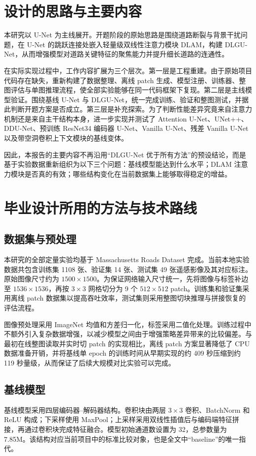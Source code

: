 \documentclass[12pt,a4paper]{ctexart}
\begin{document}
\section{设计的思路与主要内容}
本研究以 U-Net 为主线展开。开题阶段的原始思路是围绕道路断裂与背景干扰问题，在 U-Net 的跳跃连接处嵌入轻量级双线性注意力模块 DLAM，构建 DLGU-Net，从而增强模型对道路关键特征的聚焦能力并提升细长道路的连通性。

在实际实现过程中，工作内容扩展为三个层次。第一层是工程重建。由于原始项目代码存在缺失，重新构建了数据整理、离线 patch 生成、模型注册、训练器、整图评估与单图推理流程，使全部实验能够在同一代码框架下复现。第二层是主线模型验证。围绕基线 U-Net 与 DLGU-Net，统一完成训练、验证和整图测试，并据此判断开题方案是否成立。第三层是补充探索。为了判断性能差异究竟来自注意力机制还是来自主干结构本身，进一步实现并测试了 Attention U-Net、UNet++、DDU-Net、预训练 ResNet34 编码器 U-Net、Vanilla U-Net、残差 Vanilla U-Net 以及带空洞卷积上下文模块的基线变体。

因此，本报告的主要内容不再沿用“DLGU-Net 优于所有方法”的预设结论，而是基于实验数据重新组织为以下三个问题：基线模型能达到什么水平；DLAM 注意力模块是否真的有效；哪些结构变化在当前数据集上能够取得稳定的增益。

\section{毕业设计所用的方法与技术路线}
\subsection{数据集与预处理}
本研究的全部定量实验均基于 Massachusetts Roads Dataset 完成。当前本地实验数据共包含训练集 1108 张、验证集 14 张、测试集 49 张遥感影像及其对应标注。原始图像尺寸约为 $1500 \times 1500$。为保证网络输入尺寸统一，先将图像与标签补边至 $1536 \times 1536$，再按 $3 \times 3$ 网格切分为 9 个 $512 \times 512$ patch。训练集和验证集采用离线 patch 数据集以提高吞吐效率，测试集则采用整图切块推理与拼接恢复的评估流程。

图像预处理采用 ImageNet 均值和方差归一化，标签采用二值化处理。训练过程中不额外引入复杂数据增强，以减少模型之间由于增强策略差异带来的比较偏差。与最初在线整图读取并实时切 patch 的实现相比，离线 patch 方案显著降低了 CPU 数据准备开销，并将基线单 epoch 的训练时间从早期实现的约 409 秒压缩到约 119 秒量级，从而保证了后续大规模对比实验可以完成。

\subsection{基线模型}
基线模型采用四层编码器--解码器结构。卷积块由两层 $3 \times 3$ 卷积、BatchNorm 和 ReLU 构成；下采样使用 MaxPool；上采样采用双线性插值后与编码端特征拼接，再通过卷积块完成特征融合。模型初始通道数设置为 32，总参数量为 7.85M。该结构对应当前项目中的标准比较对象，也是全文中“baseline”的唯一指代。
\end{document}
